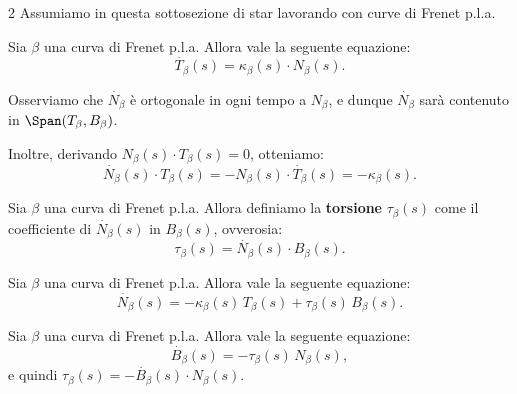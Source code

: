 \begin{multicols*}{2}
    Assumiamo in questa sottosezione di star lavorando con curve di Frenet p.l.a.

    \begin{proposition}
        Sia $\beta$ una curva di Frenet p.l.a. Allora vale la seguente
        equazione:
        \begin{equation} \label{eq:frenet_1} \tag{F1}
            \boxed{\dot{T_\beta}(s) = \kappa_\beta(s) \cdot N_\beta(s).}
        \end{equation}
    \end{proposition}

    \begin{remark}
        Osserviamo che $\dot{N_\beta}$ è ortogonale in ogni tempo
        a $N_\beta$, e dunque $\dot{N_\beta}$ sarà contenuto in
        $\Span(T_\beta, B_\beta)$. \medskip

        Inoltre, derivando $N_\beta(s) \cdot T_\beta(s) = 0$, otteniamo:
        \[ \dot{N_\beta}(s) \cdot T_\beta(s) = -N_\beta(s) \cdot \dot{T_\beta}(s) = -\kappa_\beta(s). \]
    \end{remark}

    \begin{definition}[Torsione]
        Sia $\beta$ una curva di Frenet p.l.a. Allora definiamo la
        \textbf{torsione} $\tau_\beta(s)$ come il coefficiente di $\dot{N_\beta}(s)$ in
        $B_\beta(s)$, ovverosia:
        \[ \boxed{\tau_\beta(s) = \dot{N_\beta}(s) \cdot B_\beta(s).} \]
    \end{definition}

    \begin{proposition}
        Sia $\beta$ una curva di Frenet p.l.a. Allora vale la seguente
        equazione:
        \begin{equation} \label{eq:frenet_2} \tag{F2}
            \boxed{\dot{N_\beta}(s) = - \kappa_\beta(s) \, T_\beta(s) + \tau_\beta(s) \, B_\beta(s).}
        \end{equation}
    \end{proposition}

    \begin{proposition}
        Sia $\beta$ una curva di Frenet p.l.a. Allora vale la seguente
        equazione:
        \begin{equation} \label{eq:frenet_3} \tag{F3}
            \boxed{\dot{B_\beta}(s) = -\tau_\beta(s) \, N_\beta(s),}
        \end{equation}
        e quindi $\boxed{\tau_\beta(s) = -\dot{B_\beta}(s) \cdot N_\beta(s)}$.
    \end{proposition}


\end{multicols*}
